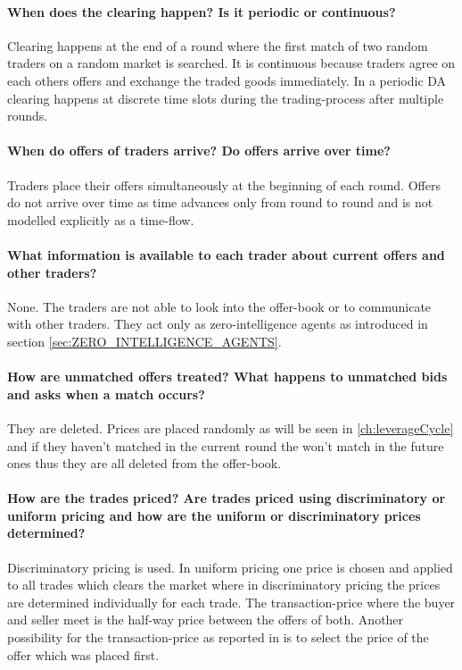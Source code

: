 \documentclass[../Bachelorarbeit.tex]{subfiles}
\begin{document}
\paragraph{When does the clearing happen? Is it periodic or continuous?} Clearing happens at the end of a round where the first match of two random traders on a random market is searched. It is continuous because traders agree on each others offers and exchange the traded goods immediately. In a periodic DA clearing happens at discrete time slots during the trading-process after multiple rounds.

\paragraph{When do offers of traders arrive? Do offers arrive over time?} Traders place their offers simultaneously at the beginning of each round. Offers do not arrive over time as time advances only from round to round and is not modelled explicitly as a time-flow.

\paragraph{What information is available to each trader about current offers and other traders?} None. The traders are not able to look into the offer-book or to communicate with other traders. They act only as \gls{zero-intelligence agents} as introduced in section \ref{sec:ZERO_INTELLIGENCE_AGENTS}.

\paragraph{How are unmatched offers treated? What happens to unmatched bids and asks when a match occurs?} They are deleted. Prices are placed randomly as will be seen in \ref{ch:leverageCycle} and if they haven't matched in the current round the won't match in the future ones thus they are all deleted from the offer-book.

\paragraph{How are the trades priced? Are trades priced using discriminatory or uniform pricing and how are the uniform or discriminatory prices determined?} Discriminatory pricing is used. In uniform pricing one price is chosen and applied to all trades which clears the market where in discriminatory pricing the prices are determined individually for each trade. The \gls{transaction-price} where the buyer and seller meet is the half-way price between the offers of both. Another possibility for the transaction-price as reported in \cite{GodeSunder1993} is to select the price of the offer which was placed first.
\end{document}
